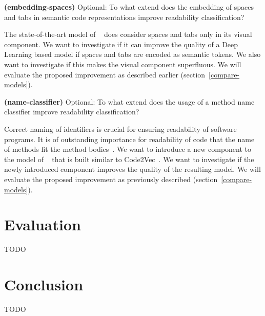 \documentclass[%
class=scrreprt,
chapterprefix=false,%
open=right,%
twoside=false,%
paper=a4,%
logofile={Logo\_zentral\_farbig\_EN.png},%
thesistype=master,%
UKenglish,%
]{se2thesis}
\begin{document}
	\begin{resq} \textbf{(embedding-spaces)} Optional: To what extend does the embedding of spaces and tabs in semantic code representations improve readability classification?\end{resq} \label{embedding-spaces}
	The state-of-the-art model of \citeauthor{mi2022towards}~\cite{mi2022towards} does consider spaces and tabs only in its visual component. We want to investigate if it can improve the quality of a Deep Learning based model if spaces and tabs are encoded as semantic tokens. We also want to investigate if this makes the visual component superfluous. We will evaluate the proposed improvement as described earlier (section~\ref{compare-models}).
	
	\begin{resq} \textbf{(name-classifier)} Optional: To what extend does the usage of a method name classifier improve readability classification?\end{resq} \label{name-classifier}
	Correct naming of identifiers is crucial for ensuring readability of software programs. It is of outstanding importance for readability of code that the name of methods fit the method bodies~\cite{liu2019learning}. We want to introduce a new component to the model of \citeauthor{mi2022towards}~\cite{mi2022towards} that is built similar to Code2Vec~\cite{alon2019code2vec}. We want to investigate if the newly introduced component improves the quality of the resulting model. We will evaluate the proposed improvement as previously described (section~\ref{compare-models}).
	
	\section{Evaluation} \label{Evaluation}
	TODO
	
	\section{Conclusion} \label{Conclusion}
	TODO
	
	\backmatter
	
	\printbibliography
	
\end{document}
